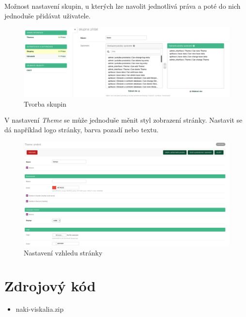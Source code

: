 Možnost nastavení skupin, u kterých lze navolit jednotlivá práva a poté do nich jednoduše přidávat uživatele.

\begin{figure}[H] \centering
  \includegraphics[width=420pt]{./pictures/56-skupiny.png}
    \caption[Tvorba skupin]{Tvorba skupin}
	\label{Tvorba skupin}                                
\end{figure}


V nastavení \emph{Theme} se může jednoduše měnit styl zobrazení stránky. Nastavit se dá například logo stránky, barva pozadí nebo textu.

\begin{figure}[H] \centering
  \includegraphics[width=420pt]{./pictures/57-theme.png}
    \caption[Nastavení vzhledu stránky]{Nastavení vzhledu stránky}
	\label{Nastavení vzhledu stránky}                                
\end{figure}



\chapter{Zdrojový kód}
\label{Zdrojový kód}

\begin{itemize}
	\item naki-viskalia.zip
\end{itemize}


